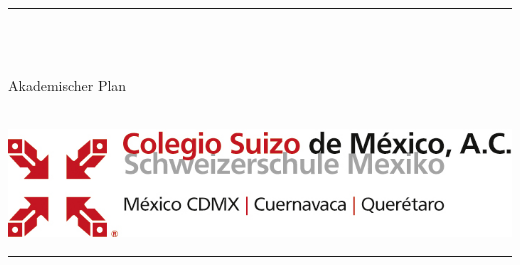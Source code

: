 \fancyhead[C]{}
\hrule \medskip
\begin{minipage}{0.295\textwidth} 
\raggedright
\footnotesize
\yourname \hfill\\ 
\yournetid \hfill\\ 
\youremail
\end{minipage}
\begin{minipage}{0.3\textwidth} 
\centering 
\large 
Akademischer Plan \\ 
\normalsize 
\coursename\\ 
\end{minipage}
\begin{minipage}{0.395\textwidth} 
\raggedleft
\includegraphics[]{logo}\hfill\\
\end{minipage}
\medskip\hrule 
\bigskip
